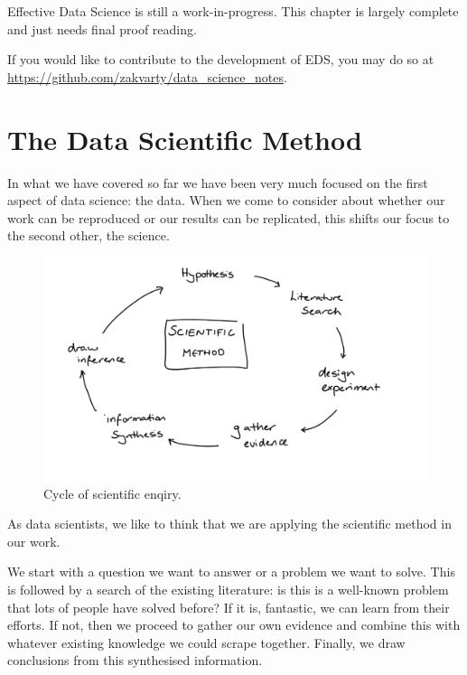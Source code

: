 \documentclass[
  12pt,
]{book}
\begin{document}
Effective Data Science is still a work-in-progress. This chapter is largely complete and just needs final proof reading.

If you would like to contribute to the development of EDS, you may do so at \url{https://github.com/zakvarty/data_science_notes}.

\hypertarget{the-data-scientific-method}{%
\section{The Data Scientific Method}\label{the-data-scientific-method}}

In what we have covered so far we have been very much focused on the first aspect of data science: the data. When we come to consider about whether our work can be reproduced or our results can be replicated, this shifts our focus to the second other, the science.

\begin{figure}
\includegraphics[width=16.67in]{images/401-production-reproducibility/scientific-method} \caption{Cycle of scientific enqiry.}\label{fig:unnamed-chunk-2}
\end{figure}

As data scientists, we like to think that we are applying the scientific method in our work.

We start with a question we want to answer or a problem we want to solve. This is followed by a search of the existing literature: is this is a well-known problem that lots of people have solved before? If it is, fantastic, we can learn from their efforts. If not, then we proceed to gather our own evidence and combine this with whatever existing knowledge we could scrape together. Finally, we draw conclusions from this synthesised information.
\end{document}
